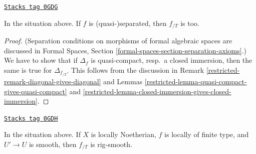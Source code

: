\begin{lemma}
\label{restricted-lemma-quasi-separated-gives-quasi-separated}
\href{https://stacks.math.columbia.edu/tag/0GDG}{\texttt{Stacks tag 0GDG}}

In the situation above. If $f$ is (quasi-)separated, then
$f_{/T}$ is too.
\end{lemma}

\begin{proof}

(Separation conditions on morphisms of formal algebraic spaces are discussed in
Formal Spaces, Section
\ref{formal-spaces-section-separation-axioms}.)
We have to show that if $\Delta_f$ is quasi-compact, resp.\ a closed immersion,
then the same is true for $\Delta_{f_{/T}}$. This follows from the discussion
in Remark \ref{restricted-remark-diagonal-gives-diagonal} and
Lemmas \ref{restricted-lemma-quasi-compact-gives-quasi-compact} and
\ref{restricted-lemma-closed-immersion-gives-closed-immersion}.
\end{proof}

\begin{lemma}
\label{restricted-lemma-smooth-gives-rig-smooth}
\href{https://stacks.math.columbia.edu/tag/0GDH}{\texttt{Stacks tag 0GDH}}

In the situation above. If $X$ is locally Noetherian,
$f$ is locally of finite type, and $U' \to U$ is smooth, then
$f_{/T}$ is rig-smooth.
\end{lemma}

